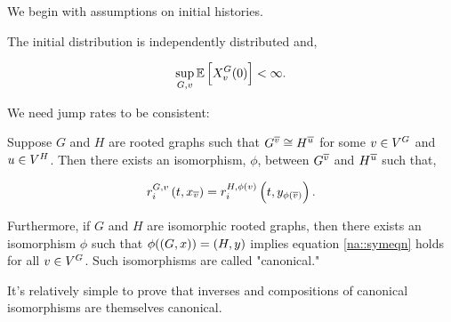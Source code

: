 We begin with assumptions on initial histories. 

\lin

\begin{nassu}
\label{na::start}

The initial distribution is independently distributed  and,

\[\sup_{G,v} \mathbb{E}\left[X^{G}_{v}(0)\right] < \infty.\]
\end{nassu}

\lin


We need jump rates to be consistent:

\lin

\begin{nassu}
\label{na::consist}

Suppose \(G\) and \(H\) are rooted graphs such that \(G^{\overline{v}} \cong H^{\overline{u}}\) for some \(v \in V^{G}\) and \(u\in V^{H}\). Then there exists an isomorphism, \(\phi\),  between \(G^{\overline{v}}\) and \(H^{\overline{u}}\) such that,

\begin{equation}
\rate\gvpara{G}{v}\stpara{i}\tmepro{t}{\xf\vind{\cl{v}}}{} = \rate\gvpara{H}{\phi(v)}\stpara{i}\tmepro{t}{\xg\vind{\phi(\cl{v})}}{}.
\label{na::symeqn}
\end{equation}

Furthermore, if \(G\) and \(H\) are isomorphic rooted graphs, then there exists an isomorphism \(\phi\) such that \(\phi((G,x)) = (H,y)\) implies equation \eqref{na::symeqn} holds for all \(v \in V^{G}\). Such isomorphisms are called "canonical."
\end{nassu}

\lin

\remark It's relatively simple to prove that inverses and compositions of canonical isomorphisms are themselves canonical.

